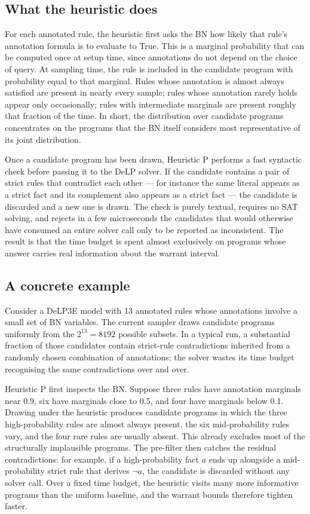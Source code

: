 \documentclass[11pt,a4paper]{article}
\begin{document}
\subsection*{What the heuristic does}

For each annotated rule, the heuristic first asks the BN how likely that rule's annotation formula is to evaluate to True. This is a marginal probability that can be computed once at setup time, since annotations do not depend on the choice of query. At sampling time, the rule is included in the candidate program with probability equal to that marginal. Rules whose annotation is almost always satisfied are present in nearly every sample; rules whose annotation rarely holds appear only occasionally; rules with intermediate marginals are present roughly that fraction of the time. In short, the distribution over candidate programs concentrates on the programs that the BN itself considers most representative of its joint distribution.

Once a candidate program has been drawn, Heuristic P performs a fast syntactic check before passing it to the DeLP solver. If the candidate contains a pair of strict rules that contradict each other --- for instance the same literal appears as a strict fact and its complement also appears as a strict fact --- the candidate is discarded and a new one is drawn. The check is purely textual, requires no SAT solving, and rejects in a few microseconds the candidates that would otherwise have consumed an entire solver call only to be reported as inconsistent. The result is that the time budget is spent almost exclusively on programs whose answer carries real information about the warrant interval.

\subsection*{A concrete example}

Consider a DeLP3E model with 13 annotated rules whose annotations involve a small set of BN variables. The current sampler draws candidate programs uniformly from the $2^{13}{=}8192$ possible subsets. In a typical run, a substantial fraction of those candidates contain strict-rule contradictions inherited from a randomly chosen combination of annotations; the solver wastes its time budget recognising the same contradictions over and over.

Heuristic P first inspects the BN. Suppose three rules have annotation marginals near 0.9, six have marginals close to 0.5, and four have marginals below 0.1. Drawing under the heuristic produces candidate programs in which the three high-probability rules are almost always present, the six mid-probability rules vary, and the four rare rules are usually absent. This already excludes most of the structurally implausible programs. The pre-filter then catches the residual contradictions: for example, if a high-probability fact $a$ ends up alongside a mid-probability strict rule that derives $\neg a$, the candidate is discarded without any solver call. Over a fixed time budget, the heuristic visits many more informative programs than the uniform baseline, and the warrant bounds therefore tighten faster.
\end{document}
